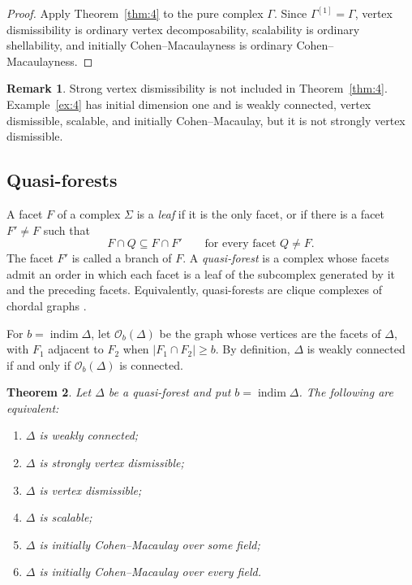 \documentclass[11pt]{amsart}
\DeclareMathOperator{\indim}{indim}
\newtheorem{theorem}{Theorem}[section]
\theoremstyle{definition}
\newtheorem{remark}[theorem]{Remark}
\begin{document}
	\begin{proof}
		Apply Theorem~\ref{thm:4} to the pure complex $\Gamma$.  Since $\Gamma^{[1]}=\Gamma$, vertex dismissibility is ordinary vertex decomposability, scalability is ordinary shellability, and initially Cohen--Macaulayness is ordinary Cohen--Macaulayness.
	\end{proof}
	
	\begin{remark}\label{rem:4}
		Strong vertex dismissibility is not included in Theorem~\ref{thm:4}. Example~\ref{ex:4} has initial dimension one and is weakly connected, vertex dismissible, scalable, and initially Cohen--Macaulay, but it is not strongly vertex dismissible.
	\end{remark}
	
	\subsection{Quasi-forests}
	\label{subsec:2}
	
	A facet $F$ of a complex $\Sigma$ is a \emph{leaf} if it is the only facet, or if there is a facet $F'\ne F$ such that
	\[
	F\cap Q\subseteq F\cap F'
	\qquad\text{for every facet }Q\ne F.
	\]
	The facet $F'$ is called a branch of $F$.  A \emph{quasi-forest} is a complex whose facets admit an order in which each facet is a leaf of the subcomplex generated by it and the preceding facets.  Equivalently, quasi-forests are clique complexes of chordal graphs \cite{HerzogHibiMuraiTrungZheng2008}.
	
	For $b=\indim\Delta$, let $\mathcal O_b(\Delta)$ be the graph whose vertices are the facets of $\Delta$, with $F_1$ adjacent to $F_2$ when $|F_1\cap F_2|\geq b$.  By definition, $\Delta$ is weakly connected if and only if $\mathcal O_b(\Delta)$ is connected.
	
	\begin{theorem}\label{thm:5}
		Let $\Delta$ be a quasi-forest and put $b=\indim\Delta$.  The following are equivalent:
		\begin{enumerate}[label=\textup{(\roman*)}]
			\item $\Delta$ is weakly connected;
			\item $\Delta$ is strongly vertex dismissible;
			\item $\Delta$ is vertex dismissible;
			\item $\Delta$ is scalable;
			\item $\Delta$ is initially Cohen--Macaulay over some field;
			\item $\Delta$ is initially Cohen--Macaulay over every field.
		\end{enumerate}
	\end{theorem}
	
\end{document}
